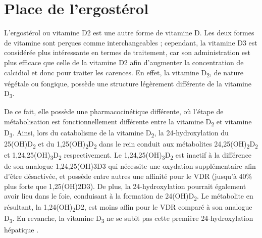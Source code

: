 \documentclass[
  a4paper,
  DIV=11,
  numbers=noendperiod,
  listof=totoc]{scrreprt}
\begin{document}
\hypertarget{place-de-lergostuxe9rol}{%
\section{Place de l'ergostérol}\label{place-de-lergostuxe9rol}}

L'ergostérol ou vitamine D2 est une autre forme de vitamine D. Les deux
formes de vitamine sont perçues comme interchangeables ; cependant, la
vitamine D3 est considérée plus intéressante en termes de traitement,
car son administration est plus efficace que celle de la vitamine D2
afin d'augmenter la concentration de calcidiol et donc pour traiter les
carences. En effet, la vitamine D\textsubscript{2}, de nature végétale
ou fongique, possède une structure légèrement différente de la vitamine
D\textsubscript{3}.

De ce fait, elle possède une pharmacocinétique différente, où l'étape de
métabolisation est fonctionnellement différente entre la vitamine
D\textsubscript{2} et vitamine D\textsubscript{3}. Ainsi, lors du
catabolisme de la vitamine D\textsubscript{2}, la 24-hydroxylation du
25(OH)D\textsubscript{2} et du
1,25(OH)\textsubscript{2}D\textsubscript{2} dans le rein conduit aux
métabolites 24,25(OH)\textsubscript{2}D\textsubscript{2} et
1,24,25(OH)\textsubscript{3}D\textsubscript{2} respectivement. Le
1,24,25(OH)\textsubscript{3}D\textsubscript{2} est inactif à la
différence de son analogue \ac{1,24,25(OH)3D3} qui nécessite une
oxydation supplémentaire afin d'être désactivée, et possède entre autres
une affinité pour le \ac{VDR} (jusqu'à 40\% plus forte que
\ac{1,25(OH)2D3}). De plus, la 24-hydroxylation pourrait également avoir
lieu dans le foie, conduisant à la formation de
24(OH)D\textsubscript{2}. Le métabolite en résultant, la
1,24(OH)\textsubscript{2}D2, est moins affin pour le \ac{VDR} comparé à
son analogue D\textsubscript{3}. En revanche, la vitamine
D\textsubscript{3} ne se subit pas cette première 24-hydroxylation
hépatique \autocite{Houghton.2006}.
\end{document}
